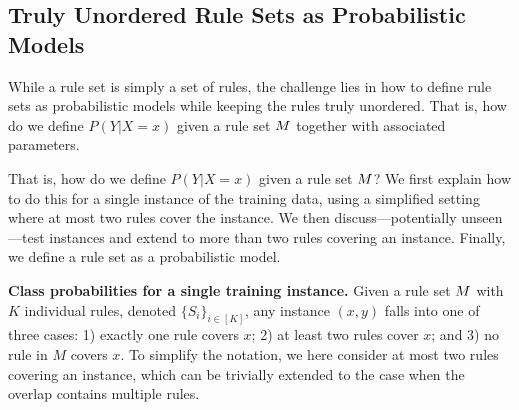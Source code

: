 \subsection{Truly Unordered Rule Sets as Probabilistic Models} \label{subsec:probRuleSet}

While a rule set is simply a set of rules, the challenge lies in how to define rule sets as probabilistic models while keeping the rules truly unordered. That is, how do we define $P(Y|X=x)$ given a rule set $M$ together with associated parameters. 

That is, how do we define $P(Y|X=x)$ given a rule set $M$? We first explain how to do this for a single instance of the training data, using a simplified setting where at most two rules cover the instance. We then discuss---potentially unseen---test instances and extend to more than two rules covering an instance. Finally, we define a rule set as a probabilistic model.


\medskip \noindent
\textbf{Class probabilities for a single training instance.} 
Given a rule set $M$ with $K$ individual rules, denoted $\{S_i\}_{i \in [K]}$, any instance $(x,y)$ falls into one of three cases: 1) exactly one rule covers $x$; 2) at least two rules cover $x$; and 3) no rule in $M$ covers $x$. To simplify the notation, we here consider at most two rules covering an instance, which can be trivially extended to the case when the overlap contains multiple rules.

